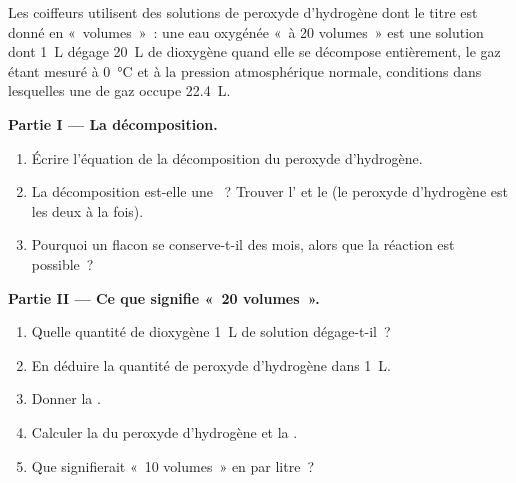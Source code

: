 \begin{problem}
\label{pb:g12:catalysis:1}
Les coiffeurs utilisent des solutions de peroxyde d'hydrogène dont le
titre est donné en «~volumes~»~: une eau oxygénée «~à 20 volumes~» est
une solution dont \qty{1}{L} dégage \qty{20}{L}
de dioxygène quand elle se décompose entièrement, le gaz étant mesuré à
\qty{0}{\celsius} et à la pression atmosphérique normale, conditions
dans lesquelles une  de gaz occupe \qty{22.4}{L}.

\medskip
\noindent\textbf{Partie I --- La décomposition.}
\begin{enumerate}
  \item Écrire l'équation de la décomposition du peroxyde d'hydrogène.
  \item La décomposition est-elle une ~?
        Trouver l' et le  (le peroxyde d'hydrogène est
        les deux à la fois).
  \item Pourquoi un flacon se conserve-t-il des mois, alors que la
        réaction est possible~?
\end{enumerate}

\medskip
\noindent\textbf{Partie II --- Ce que signifie «~20 volumes~».}
\begin{enumerate}[resume]
  \item Quelle quantité de dioxygène \qty{1}{L} de solution dégage-t-il~?
  \item En déduire la quantité de peroxyde d'hydrogène dans \qty{1}{L}.
  \item Donner la .
  \item Calculer la  du peroxyde d'hydrogène et la
        .
  \item Que signifierait «~10 volumes~» en  par litre~?
\end{enumerate}


\end{problem}
